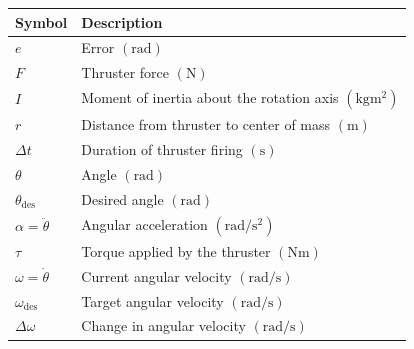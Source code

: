 
\renewcommand{\arraystretch}{1.5} %

\begin{longtable}[l]{ll}
	\toprule
	Symbol & Description \\
	\midrule
	\endhead
	\midrule
	\endfoot
	\bottomrule
	\endlastfoot
	
	\(e\) & Error \(\left(\unit{\radian}\right)\) \\
	\(F\) & Thruster force \(\left(\unit{\newton}\right)\) \\
	\(I\) & Moment of inertia about the rotation axis \(\left(\unit{\kilogram\meter\squared}\right)\) \\
	\(r\) & Distance from thruster to center of mass \(\left(\unit{\meter}\right)\) \\
	\(\Delta t\) & Duration of thruster firing \(\left(\unit{\second}\right)\) \\
	\(\theta\) & Angle \(\left(\unit{\radian}\right)\) \\
	\(\theta_{\text{des}}\) & Desired angle \(\left(\unit{\radian}\right)\) \\
	\(\alpha = \ddot{\theta}\) & Angular acceleration \(\left(\unit{\radian\per\second\squared}\right)\) \\
	\(\tau\) & Torque applied by the thruster \(\left(\unit{\newton\meter}\right)\) \\
	\(\omega = \dot{\theta}\) & Current angular velocity \(\left(\unit{\radian\per\second}\right)\) \\
	\(\omega_{\text{des}}\) & Target angular velocity \(\left(\unit{\radian\per\second}\right)\) \\
	\(\Delta\omega\) & Change in angular velocity \(\left(\unit{\radian\per\second}\right)\) \\
	
\end{longtable}
